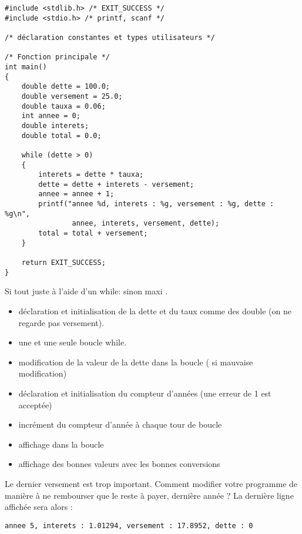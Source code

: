 \begin{correction}
  \begin{small}
\begin{verbatim}
#include <stdlib.h> /* EXIT_SUCCESS */
#include <stdio.h> /* printf, scanf */

/* déclaration constantes et types utilisateurs */

/* Fonction principale */
int main()
{
    double dette = 100.0;
    double versement = 25.0;
    double tauxa = 0.06;
    int annee = 0;
    double interets;
    double total = 0.0;

    while (dette > 0)
    {
        interets = dette * tauxa;
        dette = dette + interets - versement;
        annee = annee + 1;
        printf("annee %d, interets : %g, versement : %g, dette : %g\n", 
                annee, interets, versement, dette);
        total = total + versement;
    }   

    return EXIT_SUCCESS;
}
\end{verbatim}
  \end{small}
  
  \begin{baremeenv}
Si tout juste à l'aide d'un while:  sinon maxi .
    \begin{itemize}
      \item {}  déclaration et initialisation de la dette et
        du taux comme des double (on ne regarde pas versement).
      \item {} une et une seule boucle while.
      \item {} modification de la valeur de la dette dans la
        boucle ( si mauvaise modification)
      \item {} déclaration et initialisation du compteur
        d'années (une erreur de 1 est acceptée)
      \item {} incrément du compteur d'année à chaque tour de boucle
  \item {} affichage dans la boucle
    \item {} affichage des bonnes valeurs avec les bonnes conversions
    \end{itemize}
  \end{baremeenv}
\end{correction}

\question Le dernier versement est trop important. Comment modifier
votre programme de manière à  ne rembourser que le reste à payer,
dernière année ? La dernière ligne affichée sera alors :
\begin{small}
\begin{verbatim}
annee 5, interets : 1.01294, versement : 17.8952, dette : 0
\end{verbatim}
\end{small}

